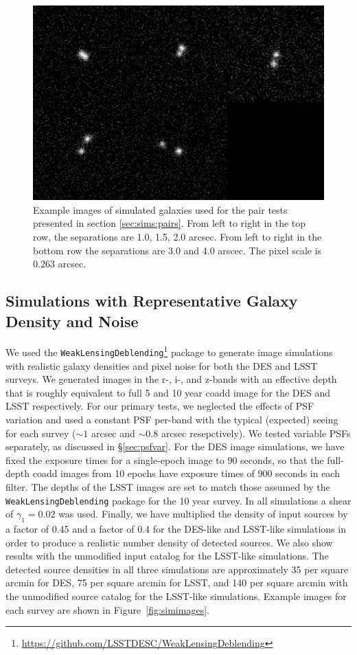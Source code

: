\documentclass[fleqn,useAMS,usenatbib]{mnras}
\begin{document}
\begin{figure}
    \includegraphics[width=\textwidth]{figures/bdk-comb.png}
    \caption{Example images of simulated galaxies used for the pair tests
    presented in section \ref{sec:sims:pairs}.  From left to right in the top row,
    the separations are 1.0, 1.5, 2.0 arcsec. From left to right in the bottom row the
    separations are 3.0 and 4.0 arscec. The pixel scale is 0.263 arcsec.
    \label{fig:pairs}}
\end{figure}

\subsection{Simulations with Representative Galaxy Density and Noise}
\label{sec:sims:realgals}

We used the
\texttt{WeakLensingDeblending}\footnote{\url{https://github.com/LSSTDESC/WeakLensingDeblending}}
package to generate image simulations with realistic galaxy densities and
pixel noise for both the DES and LSST surveys. We generated images in the r-,
i-, and z-bands with an effective depth that is roughly equivalent to full 5
and 10 year coadd image for the DES and LSST respectively. For our primary
tests, we neglected the effects of PSF variation and used a constant PSF
per-band with the typical (expected) seeing for each survey ($\sim\!1$ arcsec
and $\sim\!0.8$ arcsec resepctively). We tested variable PSFs separately, as
discussed in \S \ref{sec:psfvar}.  For the DES image simulations, we have fixed
the exposure times for a single-epoch image to 90 seconds, so that the
full-depth coadd images from 10 epochs have exposure times of 900 seconds in each
filter. The depths of the LSST images are set to match those assumed by the
\texttt{WeakLensingDeblending} package for the 10 year survey. In all
simulations a shear of $\gamma_1 = 0.02$ was used. Finally, we have multiplied
the density of input sources by a factor of 0.45 and a factor of 0.4 for the
DES-like and LSST-like simulations in order to produce a realistic number
density of detected sources. We also show results with the unmodified input
catalog for the LSST-like simulations. The detected source densities in all
three simulations are approximately 35 per square arcmin for DES, 75 per square
arcmin for LSST, and 140 per square arcmin with the unmodified source catalog
for the LSST-like simulations. Example images for each survey are shown in
Figure~\ref{fig:simimages}.
\end{document}
